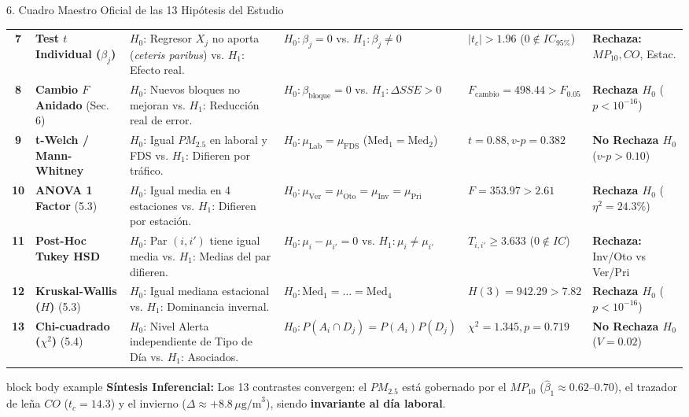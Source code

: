 \documentclass[aspectratio=169, 9pt]{beamer}
\begin{document}
\begin{frame}{6. Cuadro Maestro Oficial de las 13 Hipótesis del Estudio}
{\begin{tabular}{clllll}
    \textbf{7} & \textbf{Test $t$ Individual ($\beta_j$)} & $H_0$: Regresor $X_j$ no aporta (\textit{ceteris paribus}) vs. $H_1$: Efecto real. & $H_0: \beta_j = 0$ vs. $H_1: \beta_j \neq 0$ & $|t_c| > 1.96$ ($0 \notin IC_{95\%}$) & \textbf{Rechaza:} $MP_{10}, CO$, Estac. \\
    \textbf{8} & \textbf{Cambio $F$ Anidado} (Sec. 6) & $H_0$: Nuevos bloques no mejoran vs. $H_1$: Reducción real de error. & $H_0: \beta_{\text{bloque}} = 0$ vs. $H_1: \Delta SSE > 0$ & $F_{\text{cambio}} = \mathbf{498.44} > F_{0.05}$ & \textbf{Rechaza $H_0$} ($p<10^{-16}$) \\
    \textbf{9} & \textbf{t-Welch / Mann-Whitney} & $H_0$: Igual $PM_{2.5}$ en laboral y FDS vs. $H_1$: Difieren por tráfico. & $H_0: \mu_{\text{Lab}} = \mu_{\text{FDS}}$ ($\text{Med}_1=\text{Med}_2$) & $t = \mathbf{0.88}, v\text{-}p = \mathbf{0.382}$ & \textbf{No Rechaza $H_0$} ($v\text{-}p>0.10$) \\
    \textbf{10} & \textbf{ANOVA 1 Factor} (5.3) & $H_0$: Igual media en 4 estaciones vs. $H_1$: Difieren por estación. & $H_0: \mu_{\text{Ver}}=\mu_{\text{Oto}}=\mu_{\text{Inv}}=\mu_{\text{Pri}}$ & $F = \mathbf{353.97} > 2.61$ & \textbf{Rechaza $H_0$} ($\eta^2 = 24.3\%$) \\
    \textbf{11} & \textbf{Post-Hoc Tukey HSD} & $H_0$: Par $(i,i')$ tiene igual media vs. $H_1$: Medias del par difieren. & $H_0: \mu_i - \mu_{i'} = 0$ vs. $H_1: \mu_i \neq \mu_{i'}$ & $T_{i,i'} \ge 3.633$ ($0 \notin IC$) & \textbf{Rechaza:} Inv/Oto vs Ver/Pri \\
    \textbf{12} & \textbf{Kruskal-Wallis ($H$)} (5.3) & $H_0$: Igual mediana estacional vs. $H_1$: Dominancia invernal. & $H_0: \text{Med}_1=\dots=\text{Med}_4$ & $H(3) = \mathbf{942.29} > 7.82$ & \textbf{Rechaza $H_0$} ($p<10^{-16}$) \\
    \textbf{13} & \textbf{Chi-cuadrado ($\chi^2$)} (5.4) & $H_0$: Nivel Alerta independiente de Tipo de Día vs. $H_1$: Asociados. & $H_0: P(A_i \cap D_j) = P(A_i)P(D_j)$ & $\chi^2 = \mathbf{1.345}, p = \mathbf{0.719}$ & \textbf{No Rechaza $H_0$} ($V = 0.02$) \\
    \bottomrule
  \end{tabular}
}

\vspace{0.06cm}
\begin{beamercolorbox}[wd=\textwidth, rounded=true, sep=2.5pt]{block body example}
  \tiny\textbf{Síntesis Inferencial:} Los 13 contrastes convergen: el $PM_{2.5}$ está gobernado por el $MP_{10}$ ($\hat{\beta}_1 \approx 0.62\text{--}0.70$), el trazador de leña $CO$ ($t_c=14.3$) y el invierno ($\Delta \approx +8.8\,\mu\text{g/m}^3$), siendo \textbf{invariante al día laboral}.
\end{beamercolorbox}
\end{frame}
\end{document}
